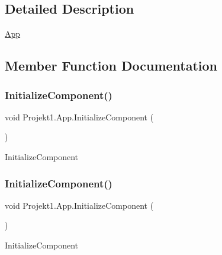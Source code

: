 \subsection{Detailed Description}
\mbox{\hyperlink{class_projekt1_1_1_app}{App}} 



\subsection{Member Function Documentation}
\mbox{\label{class_projekt1_1_1_app_ab98f0cfad2be8796f52d6f5883e0a06b}} 
\subsubsection{\texorpdfstring{InitializeComponent()}{InitializeComponent()}\hspace{0.1cm}{\footnotesize\ttfamily [1/2]}}
{\footnotesize\ttfamily void Projekt1.\+App.\+Initialize\+Component (\begin{DoxyParamCaption}{ }\end{DoxyParamCaption})}



Initialize\+Component 

\mbox{\label{class_projekt1_1_1_app_ab98f0cfad2be8796f52d6f5883e0a06b}} 
\subsubsection{\texorpdfstring{InitializeComponent()}{InitializeComponent()}\hspace{0.1cm}{\footnotesize\ttfamily [2/2]}}
{\footnotesize\ttfamily void Projekt1.\+App.\+Initialize\+Component (\begin{DoxyParamCaption}{ }\end{DoxyParamCaption})}



Initialize\+Component 

\mbox{\label{class_projekt1_1_1_app_a3277cdd767e14a1c69be2aedd7004a5d}} 
